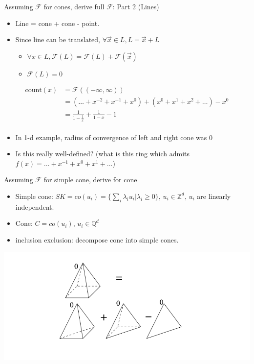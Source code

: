 \documentclass[8pt]{beamer}
\begin{document}
\begin{frame}[label=sec-8]{Assuming $\mathcal{F}$ for cones, derive full $\mathcal{F}$: Part 2 (Lines)}
\begin{itemize}
\item Line = cone + cone - point.
\item Since line can be translated, $\forall \vec{x} \in L, L = \vec{x} + L$
\begin{itemize}
\item $\forall x \in L, \mathcal{F}(L) = \mathcal{F}(L) + \mathcal{F}(\vec{x})$
\item $\mathcal{F}(L) = 0$
\end{itemize}
\end{itemize}

\begin{align*}
\text{count}(x) &= \mathcal{F}((-\infty, \infty)) \\
                &=( \ldots + x^{-2} + x^{-1} + x^0) + (x^0 + x^1 + x^2 + \ldots) - x^0 \\
                &= \frac{1}{1 - \frac{1}{x}} + \frac{1}{1 - x} - 1 \\ 
\end{align*}
\begin{itemize}
\item In 1-d example, radius of convergence of left and right cone was 0
\item Is this really well-defined? (what is this ring which admits $f(x) = \ldots + x^{-1} + x^0 + x^1 + \ldots$)
\end{itemize}
\end{frame}


\begin{frame}[label=sec-9]{Assuming $\mathcal{F}$ for simple cone, derive for cone}
\begin{itemize}
\item Simple cone: $SK = co(u_i) = \{ \sum_i \lambda_i u_i \vert \lambda_i \geq 0 \}$, $u_i \in \mathbb{Z}^d$, $u_i$ are linearly independent.
\item Cone: $C = co(u_i)$, $u_i \in \mathbb{Q}^d$
\item inclusion exclusion: decompose cone into simple cones.
\end{itemize}
\includegraphics[width=.9\linewidth]{./res/cut-cone-into-simple-cones.png}
\end{frame}
\end{document}
